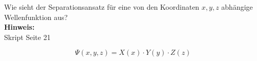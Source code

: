 \begin{question}[section=2,name={Seperatoinsansatz 1},difficulty=,quantity=2,type=thr,tags={20130625}]
	Wie sieht der Separationsansatz für eine von den Koordinaten $x, y, z$ abhängige Wellenfunktion aus?
	\\ \textbf{Hinweis:}\\
	Skript Seite 21
\end{question}
\begin{solution}
	\begin{equation}
	\Psi(x,y,z) = X(x) \cdot Y(y)\cdot Z(z)
\end{equation}
\end{solution}